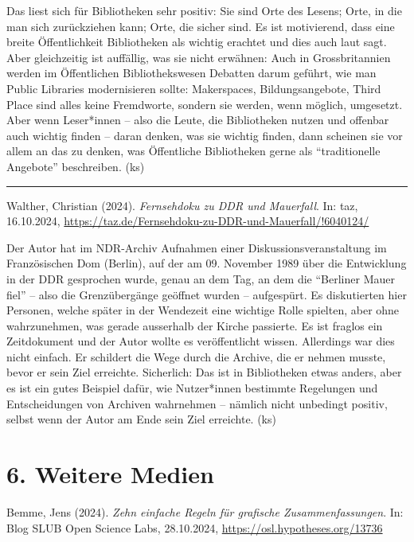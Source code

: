 \documentclass[a4paper,
fontsize=11pt,
oneside,
numbers=noperiodatend,
parskip=half-,
bibliography=totoc,
final
]{scrartcl}
\begin{document}
Das liest sich für Bibliotheken sehr positiv: Sie sind Orte des Lesens;
Orte, in die man sich zurückziehen kann; Orte, die sicher sind. Es ist
motivierend, dass eine breite Öffentlichkeit Bibliotheken als wichtig
erachtet und dies auch laut sagt. Aber gleichzeitig ist auffällig, was
sie nicht erwähnen: Auch in Grossbritannien werden im Öffentlichen
Bibliothekswesen Debatten darum geführt, wie man Public Libraries
modernisieren sollte: Makerspaces, Bildungsangebote, Third Place sind
alles keine Fremdworte, sondern sie werden, wenn möglich, umgesetzt.
Aber wenn Leser*innen -- also die Leute, die Bibliotheken nutzen und
offenbar auch wichtig finden -- daran denken, was sie wichtig finden,
dann scheinen sie vor allem an das zu denken, was Öffentliche
Bibliotheken gerne als ``traditionelle Angebote'' beschreiben. (ks)

\begin{center}\rule{0.5\linewidth}{0.5pt}\end{center}

Walther, Christian (2024). \emph{Fernsehdoku zu DDR und Mauerfall}. In:
taz, 16.10.2024,
\url{https://taz.de/Fernsehdoku-zu-DDR-und-Mauerfall/!6040124/}

Der Autor hat im NDR-Archiv Aufnahmen einer Diskussionsveranstaltung im
Französischen Dom (Berlin), auf der am 09. November 1989 über die
Entwicklung in der DDR gesprochen wurde, genau an dem Tag, an dem die
``Berliner Mauer fiel'' -- also die Grenzübergänge geöffnet wurden --
aufgespürt. Es diskutierten hier Personen, welche später in der
Wendezeit eine wichtige Rolle spielten, aber ohne wahrzunehmen, was
gerade ausserhalb der Kirche passierte. Es ist fraglos ein Zeitdokument
und der Autor wollte es veröffentlicht wissen. Allerdings war dies nicht
einfach. Er schildert die Wege durch die Archive, die er nehmen musste,
bevor er sein Ziel erreichte. Sicherlich: Das ist in Bibliotheken etwas
anders, aber es ist ein gutes Beispiel dafür, wie Nutzer*innen bestimmte
Regelungen und Entscheidungen von Archiven wahrnehmen -- nämlich nicht
unbedingt positiv, selbst wenn der Autor am Ende sein Ziel erreichte.
(ks)

\section{6. Weitere Medien}\label{weitere-medien}

Bemme, Jens (2024). \emph{Zehn einfache Regeln für grafische
Zusammenfassungen}. In: Blog SLUB Open Science Labs, 28.10.2024,
\url{https://osl.hypotheses.org/13736}
\end{document}
